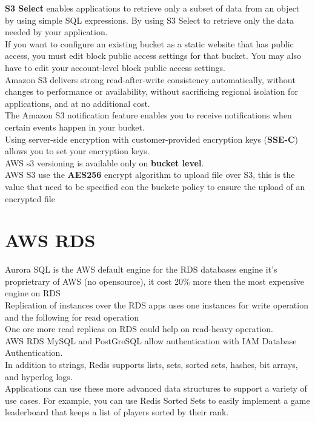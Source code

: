 \documentclass[12pt, letterpaper, twoside]{article}
\begin{document}
\textbf{S3 Select} enables applications to retrieve only a subset of data from an object by using simple SQL expressions. 
By using S3 Select to retrieve only the data needed by your application.\\

If you want to configure an existing bucket as a static website that has public access, you must edit block public access
settings for that bucket. You may also have to edit your account-level block public access settings.\\

Amazon S3 delivers strong read-after-write consistency automatically, without changes to performance or availability, 
without sacrificing regional isolation for applications, and at no additional cost.\\

The Amazon S3 notification feature enables you to receive notifications when certain events happen in your bucket.\\

Using server-side encryption with customer-provided encryption keys (\textbf{SSE-C}) allows you to set your encryption keys.\\

AWS s3 versioning is available only on \textbf{bucket level}.\\

AWS S3 use the \textbf{AES256} encrypt algorithm  to upload file over S3, this is the value that need to be 
specified con the buckete policy to ensure the upload of an encrypted file

\section{AWS RDS}
Aurora SQL is the AWS default engine for the RDS databases engine
it's proprietrary of AWS (no opensource), it cost 20\% more then the most expensive
engine on RDS\\
Replication of instances over the RDS apps uses one instances for write operation and
the following for read operation\\

One ore more read replicas on RDS could help on read-heavy operation.\\

AWS RDS MySQL and PostGreSQL allow authentication with IAM Database Authentication.\\

In addition to strings, Redis supports lists, sets, sorted sets, hashes, bit arrays, and hyperlog logs.\\
Applications can use these more advanced data structures to support a variety of use cases. For example, 
you can use Redis Sorted Sets to easily implement a game leaderboard that keeps a list of players sorted by their rank.\\
\end{document}
